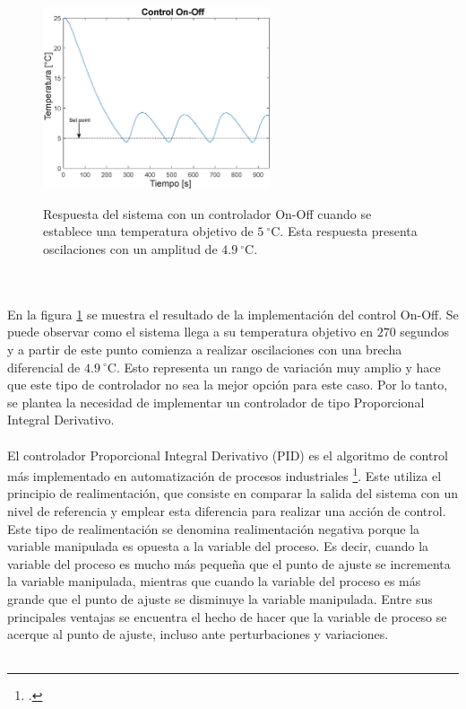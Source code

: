 \begin{figure}[h!]
\begin{centering}
    \caption{Respuesta del sistema con un controlador On-Off cuando se establece una temperatura objetivo de $5~^\circ \mbox{C}$. Esta respuesta presenta oscilaciones con un amplitud de $4.9~^\circ \mbox{C}$.}
  \includegraphics[width=0.6\textwidth]{Images/ControlOnOff.eps}
    \label{fig:ControlOnOff}
  \par\end{centering}
\end{figure}
\\ \\
En la figura \ref{fig:ControlOnOff} se muestra el resultado de la implementación del control On-Off. Se puede observar como el sistema llega a su temperatura objetivo en $270$ segundos y a partir de este punto comienza a realizar oscilaciones con una brecha diferencial de $4.9~^\circ \mbox{C}$. Esto representa un rango de variación muy amplio y hace que este tipo de controlador no sea la mejor opción para este caso. Por lo tanto, se plantea la necesidad de implementar un controlador de tipo Proporcional Integral Derivativo.\\ \\
El controlador  Proporcional Integral Derivativo (PID) es el algoritmo de control más implementado en automatización de procesos industriales \footcite{Astrom}. Este  utiliza el principio de realimentación, que consiste en comparar la salida del sistema con un nivel de referencia y emplear esta diferencia para realizar una acción de control. Este tipo de realimentación se denomina realimentación negativa porque la variable manipulada es opuesta a la variable del proceso. Es decir, cuando la variable del proceso es mucho más pequeña que el punto de ajuste se incrementa la variable manipulada, mientras que cuando la variable del proceso es más grande que el punto de ajuste se disminuye la variable manipulada. Entre sus principales ventajas se encuentra el hecho de hacer que la variable  de proceso se acerque al punto de ajuste,  incluso ante perturbaciones y variaciones.\\ \\
